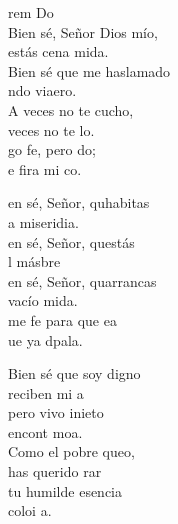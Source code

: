 \begin{cancion}%
rem            Do 	 \\
Bien sé, Señor Dios mío, \\
	 estás cena mida.\\
	Bien sé que me haslamado \\
	ndo viaero.\\
	\jump
	A veces no te cucho, \\
	veces no te lo.\\
	go fe, pero do; \\
	e fira mi co.  \jump\\
	\begin{chorus}%
		en sé, Señor, quhabitas \\
		a miseridia. \\
		en sé, Señor, questás\\
		l másbre\\
		en sé, Señor, quarrancas\\
		vacío mida. \\
		me fe para que ea\\
		ue ya  dpala.\jump\\
	\end{chorus}%
	Bien sé que soy digno \\
	reciben mi a\\
	pero vivo inieto\\
	 encont  moa.\\
	\jump
	Como el pobre queo, \\
	 has querido rar\\
	 tu humilde esencia \\
	 coloi a. \\
	\jump
\end{cancion}%
